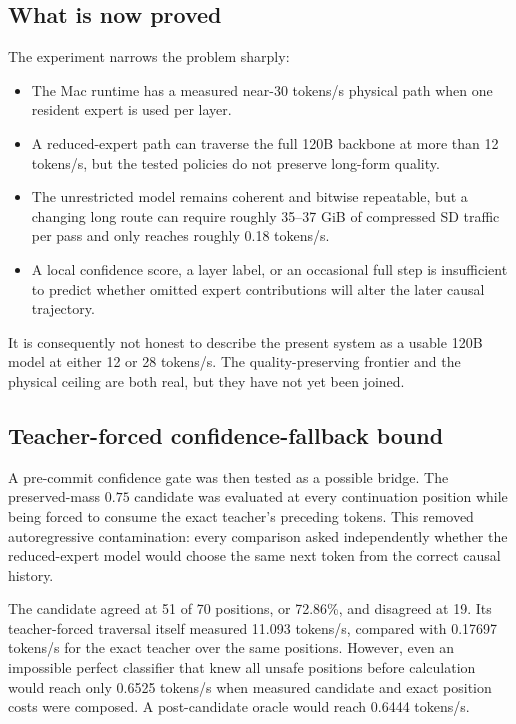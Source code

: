 \subsection{What is now proved}

The experiment narrows the problem sharply:

\begin{itemize}
  \item The Mac runtime has a measured near-30 tokens/s physical path when one
        resident expert is used per layer.
  \item A reduced-expert path can traverse the full 120B backbone at more than
        12 tokens/s, but the tested policies do not preserve long-form quality.
  \item The unrestricted model remains coherent and bitwise repeatable, but a
        changing long route can require roughly 35--37 GiB of compressed SD
        traffic per pass and only reaches roughly 0.18 tokens/s.
  \item A local confidence score, a layer label, or an occasional full step is
        insufficient to predict whether omitted expert contributions will alter
        the later causal trajectory.
\end{itemize}

It is consequently not honest to describe the present system as a usable
120B model at either 12 or 28 tokens/s.  The quality-preserving frontier and
the physical ceiling are both real, but they have not yet been joined.

\subsection{Teacher-forced confidence-fallback bound}

A pre-commit confidence gate was then tested as a possible bridge.  The
preserved-mass $0.75$ candidate was evaluated at every continuation position
while being forced to consume the exact teacher's preceding tokens.  This
removed autoregressive contamination: every comparison asked independently
whether the reduced-expert model would choose the same next token from the
correct causal history.

The candidate agreed at 51 of 70 positions, or 72.86\%, and disagreed at 19.
Its teacher-forced traversal itself measured 11.093 tokens/s, compared with
0.17697 tokens/s for the exact teacher over the same positions.  However, even
an impossible perfect classifier that knew all unsafe positions before
calculation would reach only 0.6525 tokens/s when measured candidate and exact
position costs were composed.  A post-candidate oracle would reach 0.6444
tokens/s.

